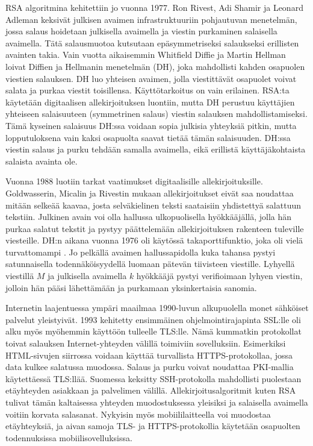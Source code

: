\documentclass[finnish]{tktltiki2}
\theoremstyle{definition}
\theoremstyle{remark}
\begin{document}
RSA algoritmina kehitettiin jo vuonna 1977. Ron Rivest, Adi Shamir ja Leonard Adleman \cite{rsa78} keksivät julkisen avaimen infrastruktuuriin pohjautuvan menetelmän, jossa salaus hoidetaan julkisella avaimella ja viestin purkaminen salaisella avaimella. Tätä salausmuotoa kutsutaan epäsymmetriseksi salaukseksi erillisten avainten takia. Vain vuotta aikaisemmin Whitfield Diffie ja Martin Hellman \cite{dh76} loivat Diffien ja Hellmanin menetelmän (DH), joka mahdollisti kahden osapuolen viestien salauksen. DH luo yhteisen avaimen, jolla viestittävät osapuolet voivat salata ja purkaa viestit toisillensa. Käyttötarkoitus on vain erilainen. RSA:ta käytetään digitaalisen allekirjoituksen luontiin, mutta DH perustuu käyttäjien yhteiseen salaisuuteen (symmetrinen salaus) viestin salauksen mahdollistamiseksi. Tämä kyseinen salaisuus DH:ssa voidaan sopia julkisia yhteyksiä pitkin, mutta lopputuloksena vain kaksi osapuolta saavat tietää tämän salaisuuden. DH:ssa viestin salaus ja purku tehdään samalla avaimella, eikä erillistä käyttäjäkohtaista salaista avainta ole.

Vuonna 1988 luotiin tarkat vaatimukset digitaalisille allekirjoituksille. Goldwasserin, Micalin ja Rivestin \cite{siam} mukaan allekirjoitukset eivät saa noudattaa mitään selkeää kaavaa, josta selväkielinen teksti saataisiin yhdistettyä salattuun tekstiin. Julkinen avain voi olla hallussa ulkopuolisella hyökkääjällä, jolla hän purkaa salatut tekstit ja pystyy päättelemään allekirjoituksen rakenteen tuleville viesteille. DH:n aikana vuonna 1976 oli käytössä takaporttifunktio, joka oli vielä turvattomampi \cite{dh76}. Jo pelkällä avaimen hallussapidolla kuka tahansa pystyi satunnaisella todennäköisyydellä luomaan pätevän tiivisteen viestille. Lyhyellä viestillä $M$ ja julkisella avaimella $k$ hyökkääjä pystyi verifioimaan lyhyen viestin, jolloin hän pääsi lähettämään ja purkamaan yksinkertaisia sanomia.

Internetin laajentuessa ympäri maailmaa 1990-luvun alkupuolella monet sähköiset palvelut yleistyivät. 1993 kehitetty ensimmäinen ohjelmointirajapinta SSL:lle oli alku myös myöhemmin käyttöön tulleelle TLS:lle. Nämä kummatkin protokollat toivat salauksen Internet-yhteyden välillä toimiviin sovelluksiin. Esimerkiksi HTML-sivujen siirrossa voidaan käyttää turvallista HTTPS-protokollaa, jossa data kulkee salatussa muodossa. Salaus ja purku voivat noudattaa PKI-mallia käytettäessä TLS:llää. Suomessa keksitty SSH-protokolla mahdollisti puolestaan etäyhteyden asiakkaan ja palvelimen välillä. Allekirjoitusalgoritmit kuten RSA tulivat tämän kaltaisessa yhteyden muodostuksessa yleisiksi ja salaisella avaimella voitiin korvata salasanat. Nykyisin myös mobiililaitteella voi muodostaa etäyhteyksiä, ja aivan samoja TLS- ja HTTPS-protokollia käytetään osapuolten todennuksissa mobiilisovelluksissa.
\end{document}

